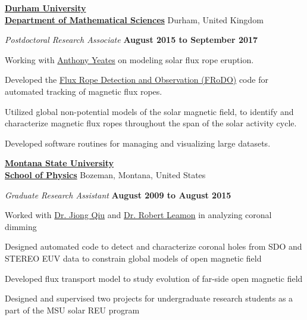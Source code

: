 \documentclass[10pt]{article}
\newenvironment{outerlist}[1][\enskip\textbullet]%
        {\begin{enumerate}[#1]}{\end{enumerate}%
         \vspace{-.6\baselineskip}}
\newenvironment{innerlist}[1][\enskip\textbullet]%
        {\begin{compactenum}[#1]}{\end{compactenum}}
\begin{document}
\href{https://www.dur.ac.uk}{\textbf{Durham University}}\\
\href{https://www.dur.ac.uk/mathematical.sciences/}{\textbf{Department of Mathematical Sciences}}
\hfill Durham, United Kingdom
\begin{outerlist}
\item[] \textit{Postdoctoral Research Associate}%
        \hfill \textbf{August 2015 to September 2017}
\begin{innerlist}
  \item Working with \href{http://www.maths.dur.ac.uk/~bmjg46/}{Anthony Yeates} on modeling solar flux rope eruption.
  \item Developed the \href{https://github.com/lowderchris/FRoDO}{Flux Rope Detection and Observation (FRoDO)} code for automated tracking of magnetic flux ropes.
  \item Utilized global non-potential models of the solar magnetic field, to identify and characterize magnetic flux ropes throughout the span of the solar activity cycle.
  \item Developed software routines for managing and visualizing large datasets.
  \\
\end{innerlist}

\end{outerlist}

\href{http://www.montana.edu}{\textbf{Montana State University}}\\
\href{http://www.physics.montana.edu}{\textbf{School of Physics}}
\hfill Bozeman, Montana, United States
\begin{outerlist}
\item[] \textit{Graduate Research Assistant}%
        \hfill \textbf{August 2009 to August 2015}
\begin{innerlist}
  \item Worked with \href{http://solar.physics.montana.edu/qiuj/}{Dr. Jiong Qiu} and \href{http://solar.physics.montana.edu/leamon/}{Dr. Robert Leamon} in analyzing coronal dimming
  \item Designed automated code to detect and characterize coronal holes from SDO and STEREO EUV data to constrain global models of open magnetic field
  \item Developed flux transport model to study evolution of far-side open magnetic field
  \item Designed and supervised two projects for undergraduate research students as a part of the MSU solar REU program
  \\
\end{innerlist}

\end{outerlist}
\end{document}
